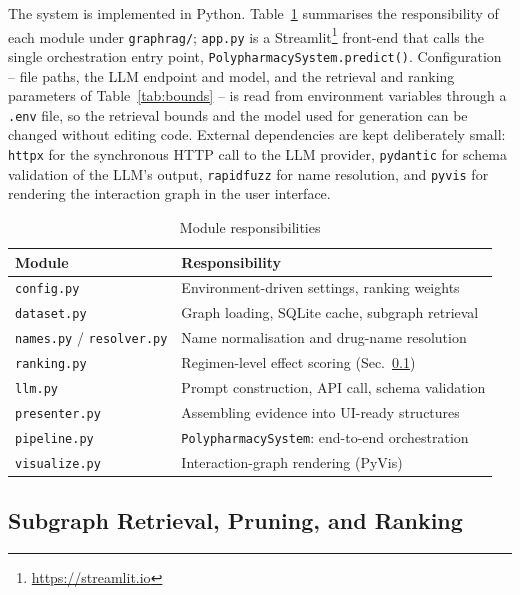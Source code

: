 The system is implemented in Python. Table~\ref{tab:modules} summarises the
responsibility of each module under \texttt{graphrag/}; \texttt{app.py} is a
Streamlit\footnote{\url{https://streamlit.io}} front-end that calls the
single orchestration entry point, \texttt{PolypharmacySystem.predict()}.
Configuration -- file paths, the LLM endpoint and model, and the retrieval
and ranking parameters of Table~\ref{tab:bounds} -- is read from
environment variables through a \texttt{.env} file, so the retrieval bounds
and the model used for generation can be changed without editing code.
External dependencies are kept deliberately small: \texttt{httpx} for the
synchronous HTTP call to the LLM provider, \texttt{pydantic} for schema
validation of the LLM's output, \texttt{rapidfuzz} for name resolution, and
\texttt{pyvis} for rendering the interaction graph in the user interface.

\begin{table}[t]
  \caption{Module responsibilities}
  \label{tab:modules}
  \centering
  \begin{tabular}{@{}ll@{}}
    \toprule
    Module & Responsibility \\
    \midrule
    \texttt{config.py}            & Environment-driven settings, ranking weights \\
    \texttt{dataset.py}           & Graph loading, SQLite cache, subgraph retrieval \\
    \texttt{names.py} / \texttt{resolver.py} & Name normalisation and drug-name resolution \\
    \texttt{ranking.py}           & Regimen-level effect scoring (Sec.~\ref{sec:retrieval-impl}) \\
    \texttt{llm.py}               & Prompt construction, API call, schema validation \\
    \texttt{presenter.py}         & Assembling evidence into UI-ready structures \\
    \texttt{pipeline.py}          & \texttt{PolypharmacySystem}: end-to-end orchestration \\
    \texttt{visualize.py}         & Interaction-graph rendering (PyVis) \\
    \bottomrule
  \end{tabular}
\end{table}

\subsection{Subgraph Retrieval, Pruning, and Ranking}
\label{sec:retrieval-impl}

